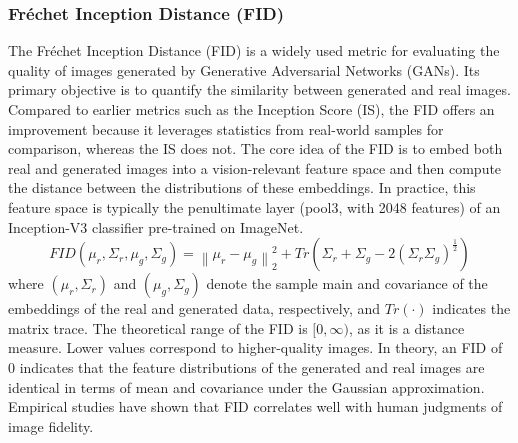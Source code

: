 \documentclass[journal]{IEEEtran}
\begin{document}
\subsubsection{Fréchet Inception Distance (FID)}
The Fréchet Inception Distance (FID) is a widely used metric for evaluating the quality of images generated by Generative Adversarial Networks (GANs)\cite{guven2024image}. Its primary objective is to quantify the similarity between generated and real images\cite{heusel2017gans}. Compared to earlier metrics such as the Inception Score (IS), the FID offers an improvement because it leverages statistics from real-world samples for comparison, whereas the IS does not\cite{kynkäänniemi2023roleimagenetclassesfrechet}.
The core idea of the FID is to embed both real and generated images into a vision-relevant feature space and then compute the distance between the distributions of these embeddings. In practice, this feature space is typically the penultimate layer (pool3, with 2048 features) of an Inception-V3 classifier pre-trained on ImageNet\cite{kynkäänniemi2023roleimagenetclassesfrechet}.
\begin{equation}
FID(\mu_r,\Sigma_r,\mu_g,\Sigma_g )=\left\|\mu_r-\mu_g \right\|_2^2+Tr(\Sigma_r+\Sigma_g-2(\Sigma_r \Sigma_g)^{\frac{1}{2}})
\end{equation}
where $(\mu_r,\Sigma_r)$ and $(\mu_g,\Sigma_g)$ denote the sample main and covariance of the embeddings of the real and generated data, respectively, and $Tr(\cdot)$ indicates the matrix trace\cite{kynkäänniemi2023roleimagenetclassesfrechet}.
The theoretical range of the FID is $[0, \infty)$, as it is a distance measure. Lower values correspond to higher-quality images\cite{wang2019improvingmmdgantrainingrepulsive}. In theory, an FID of 0 indicates that the feature distributions of the generated and real images are identical in terms of mean and covariance under the Gaussian approximation\cite{heusel2017gans}.
Empirical studies have shown that FID correlates well with human judgments of image fidelity\cite{heusel2017gans}. 
\end{document}
